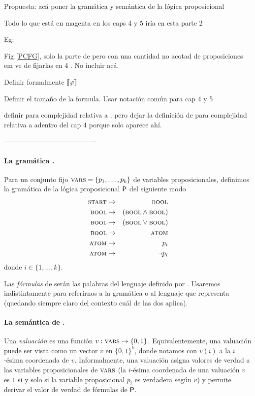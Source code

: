 

    \color{magenta}
    Propuesta: acá poner la gramática y semántica de la lógica proposicional

    Todo lo que está en magenta en los caps 4 y 5 iría en esta parte 2

    Eg:
    
    Fig \ref{PCFG}, solo la parte de \grambool pero con una cantidad no acotad de proposiciones em ve de fijarlas en 4 . No incluir \gramboolxor acá.

    Definir formalmente $\llbracket \varphi\rrbracket$

    Definir el tamaño de la formula. Usar notación común para cap 4 y 5

    definir  \mdlbool para complejidad relativa a \grambool, pero dejar la definición de
      \mdlboolxor para complejidad relativa a \gramboolxor adentro del cap 4 porque solo aparece ahí. 

\color{black}

----------------------------------------

\paragraph{La gramática \grambool.}
Para un conjunto fijo $\textsc{vars}=\{p_1,\dots,p_k\}$ de variables proposicionales, definimos la gramática de la lógica proposicional ${\sf P}$ del siguiente modo
%
\begin{eqnarray*}
\textsc{start} &\to&\textsc{bool}\\
\textsc{bool} &\to&(\textsc{bool} \wedge \textsc{bool}) \\
\textsc{bool} &\to&(\textsc{bool} \vee \textsc{bool}) \\
\textsc{bool} &\to&\textsc{atom}\\
\textsc{atom} &\to& p_i \\
\textsc{atom} &\to&\lnot p_i 
\end{eqnarray*}
donde $i\in\{1,\dots,k\}$.

Las {\em fórmulas} de \grambool serán las palabras del lenguaje definido por \grambool. Usaremos indistintamente \grambool para referirnos a la gramática o al lenguaje que representa (quedando siempre claro del contexto cuál de las dos aplica).


\paragraph{La semántica de \grambool.}
Una {\em valuación} es una función $v:\textsc{vars}\to\{0,1\}$. Equivalentemente, una valuación puede ser vista como un vector $v$ en $\{0,1\}^k$, donde notamos con $v(i)$ a la $i$-ésima coordenada de $v$. Informalmente, una valuación asigna valores de verdad a las variables proposicionales de $\textsc{vars}$ (la $i$-ésima coordenada de una valuación $v$ es $1$ si y solo si la variable proposicional $p_i$ es verdadera según $v$) y permite derivar el valor de verdad de fórmulas de ${\sf P}$.  

